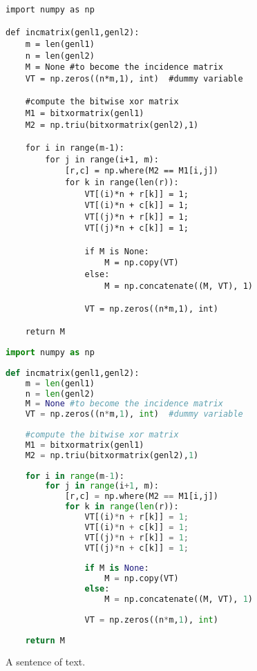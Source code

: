 \documentclass[a4paper,12pt]{article}
\begin{document}
\begin{verbatim}
import numpy as np
 
def incmatrix(genl1,genl2):
    m = len(genl1)
    n = len(genl2)
    M = None #to become the incidence matrix
    VT = np.zeros((n*m,1), int)  #dummy variable
 
    #compute the bitwise xor matrix
    M1 = bitxormatrix(genl1)
    M2 = np.triu(bitxormatrix(genl2),1) 
 
    for i in range(m-1):
        for j in range(i+1, m):
            [r,c] = np.where(M2 == M1[i,j])
            for k in range(len(r)):
                VT[(i)*n + r[k]] = 1;
                VT[(i)*n + c[k]] = 1;
                VT[(j)*n + r[k]] = 1;
                VT[(j)*n + c[k]] = 1;
 
                if M is None:
                    M = np.copy(VT)
                else:
                    M = np.concatenate((M, VT), 1)
 
                VT = np.zeros((n*m,1), int)
 
    return M
\end{verbatim}

\begin{lstlisting}[language=Python]
import numpy as np
 
def incmatrix(genl1,genl2):
    m = len(genl1)
    n = len(genl2)
    M = None #to become the incidence matrix
    VT = np.zeros((n*m,1), int)  #dummy variable
 
    #compute the bitwise xor matrix
    M1 = bitxormatrix(genl1)
    M2 = np.triu(bitxormatrix(genl2),1) 
 
    for i in range(m-1):
        for j in range(i+1, m):
            [r,c] = np.where(M2 == M1[i,j])
            for k in range(len(r)):
                VT[(i)*n + r[k]] = 1;
                VT[(i)*n + c[k]] = 1;
                VT[(j)*n + r[k]] = 1;
                VT[(j)*n + c[k]] = 1;
 
                if M is None:
                    M = np.copy(VT)
                else:
                    M = np.concatenate((M, VT), 1)
 
                VT = np.zeros((n*m,1), int)
 
    return M
\end{lstlisting}

A sentence of text.
\end{document}
